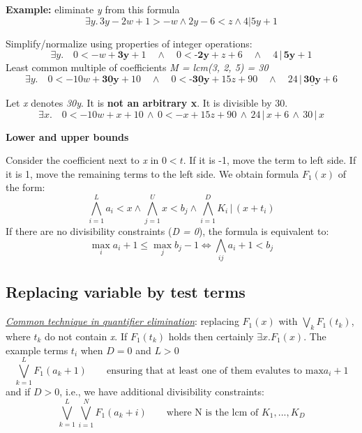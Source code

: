 \documentclass[11pt]{article}
\begin{document}
\textbf{Example:} eliminate \textit{y} from this formula $$\exists y. \, 3y - 2w + 1 > -w \land 2y - 6 < z \land 4 | 5y + 1$$

Simplify/normalize using properties of integer operations: $$\exists y. \quad 0 < -w + \textbf{3y} + 1 \quad \land \quad 0 < \textbf{-2y} + z + 6 \quad \land \quad 4 \, | \, \textbf{5y} + 1$$ Least common multiple of coefficients \textit{M = lcm(3, 2, 5) = 30} $$\exists y. \quad 0 < -10w + \underline{\textbf{30y}} + 10 \quad \land \quad 0 < \underline{\textbf{-30y}} + 15z + 90 \quad \land \quad 24 \, | \, \underline{\textbf{30y}} + 6$$ 

Let \textit{x} denotes \textit{30y}. It is \textbf{not an arbitrary x}. It is divisible by 30. $$ \exists x. \quad 0 < -10w + x + 10 \, \land \, 0 < -x + 15z + 90 \, \land \, 24 \, | \, x + 6 \, \land \, 30 \, | \, x$$  

\begin{tcolorbox}[
  colback=blue!15,     %
  colframe=black!50,    %
  boxrule=1pt,       %
  arc=3mm,             %
  left=4mm, right=4mm, top=2mm, bottom=2mm %
]
\textbf{Lower and upper bounds}
\vspace{0.3cm}

Consider the coefficient next to \textit{x} in $0 < t$. If it is -1, move the term to left side. If it is 1, move the remaining terms to the left side. We obtain formula $F_1(x)$ of the form: $$\bigwedge^{L}_{i=1}a_i < x \land \bigwedge^{U}_{j=1} x < b_j \land \bigwedge^{D}_{i=1} K_i \, | \, (x + t_i)$$ If there are no divisibility constraints (\textit{D = 0}), the formula is equivalent to: $$\mathop{\mathrm{max}}\limits_{i} a_i + 1 \leq \mathop{\mathrm{max}}\limits_{j}b_j - 1 \Leftrightarrow \bigwedge_{ij} a_i + 1 < b_j$$
\end{tcolorbox}

\subsection*{Replacing variable by test terms}

\textit{\underline{Common technique in quantifier elimination}}: replacing $F_1(x)$ with $\bigvee_k F_1(t_k)$, where $t_k$ do not contain \textit{x}. If $F_1(t_k)$ holds then certainly $\exists x. F_1(x)$. The example terms $t_i$ when $D = 0$ and $L > 0$ $$\bigvee_{k=1}^{L} F_1(a_k + 1) \quad \quad \text{ensuring that at least one of them evalutes to max} a_i + 1$$ and if $D>0$, i.e., we have additional divisibility constraints: $$\bigvee^{L}_{k=1} \bigvee^{N}_{i=1} F_1(a_k + i) \quad \quad \text{where N is the lcm of }  K_1, ..., K_D$$
\end{document}
